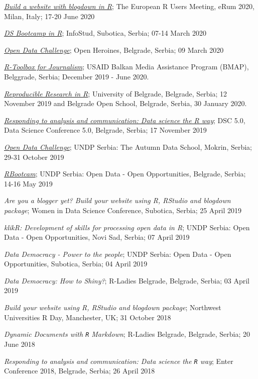 \documentclass[
]{article}
\begin{document}
\emph{\href{https://websiteinr.netlify.app}{Build a website with
blogdown in R}}; The European R Users Meeting, eRum 2020, Milan, Italy;
17-20 June 2020

\emph{\href{http://dsbootcamp.rbind.io}{DS Bootcamp in R}}; InfoStud,
Subotica, Serbia; 07-14 March 2020

\emph{\href{https://ohsa.netlify.app}{Open Data Challenge}}; Open
Heroines, Belgrade, Serbia; 09 March 2020

\emph{\href{https://rtoolbox.netlify.com/en/}{R-Toolbox for
Journalism}}; USAID Balkan Media Assistance Program (BMAP), Belggrade,
Serbia; December 2019 - June 2020.

\emph{\href{https://reproducibleresearchinr.rbind.io}{Reproducible
Research in R}}; University of Belgrade, Belgrade, Serbia; 12 November
2019 and Belgrade Open School, Belgrade, Serbia, 30 January 2020.

\emph{\href{https://github.com/RLadiesBelgrade/DSC5_RWS/blob/master/DSRWay.html}{Responding
to analysis and communication: Data science the R way}}; DSC 5.0, Data
Science Conference 5.0, Belgrade, Serbia; 17 November 2019

\emph{\href{https://datachallengewithr.rbind.io}{Open Data Challenge}};
UNDP Serbia: The Autumn Data School, Mokrin, Serbia; 29-31 October 2019

\emph{\href{http://rbootcamp.rbind.io/}{RBootcam}}; UNDP Serbia: Open
Data - Open Opportunities, Belgrade, Serbia; 14-16 May 2019

\emph{Are you a blogger yet? Build your website using R, RStudio and
blogdown package}; Women in Data Science Conference, Subotica, Serbia;
25 April 2019

\emph{klikR: Development of skills for processing open data in R}; UNDP
Serbia: Open Data - Open Opportunities, Novi Sad, Serbia; 07 April 2019

\emph{Data Democracy - Power to the people}; UNDP Serbia: Open Data -
Open Opportunities, Subotica, Serbia; 04 April 2019

\emph{Data Democracy: How to Shiny?}; R-Ladies Belgrade, Belgrade,
Serbia; 03 April 2019

\emph{Build your website using R, RStudio and blogdown package};
Northwest Universities R Day, Manchester, UK; 31 October 2018

\emph{Dynamic Documents with \texttt{R} Markdown}; R-Ladies Belgrade,
Belgrade, Serbia; 20 June 2018

\emph{Responding to analysis and communication: Data science the
\texttt{R} way}; Enter Conference 2018, Belgrade, Serbia; 26 April 2018
\end{document}
